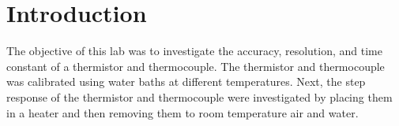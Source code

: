 
\section{Introduction}


\noindent The objective of this lab was to investigate the accuracy, resolution, and time constant of a thermistor and thermocouple.
The thermistor and thermocouple was calibrated using water baths at different temperatures. Next, the step response of the thermistor and 
thermocouple were investigated by placing them in a heater and then removing them to room temperature air and water.

